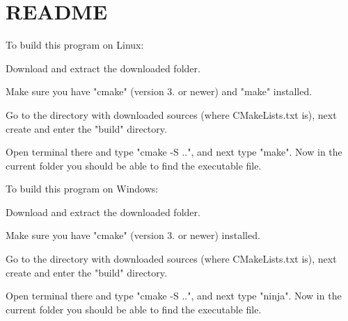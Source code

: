 \chapter{README}
\hypertarget{md_README}{}\label{md_README}
To build this program on Linux\+:
\begin{DoxyEnumerate}
\item Download and extract the downloaded folder.
\item Make sure you have "{}cmake"{} (version 3. or newer) and "{}make"{} installed.
\item Go to the directory with downloaded sources (where CMake\+Lists.\+txt is), next create and enter the "{}build"{} directory.
\item Open terminal there and type "{}cmake -\/\+S .."{}, and next type "{}make"{}. Now in the current folder you should be able to find the executable file.
\end{DoxyEnumerate}

To build this program on Windows\+:
\begin{DoxyEnumerate}
\item Download and extract the downloaded folder.
\item Make sure you have "{}cmake"{} (version 3. or newer) installed.
\item Go to the directory with downloaded sources (where CMake\+Lists.\+txt is), next create and enter the "{}build"{} directory.
\item Open terminal there and type "{}cmake -\/\+S .."{}, and next type "{}ninja"{}. Now in the current folder you should be able to find the executable file. 
\end{DoxyEnumerate}